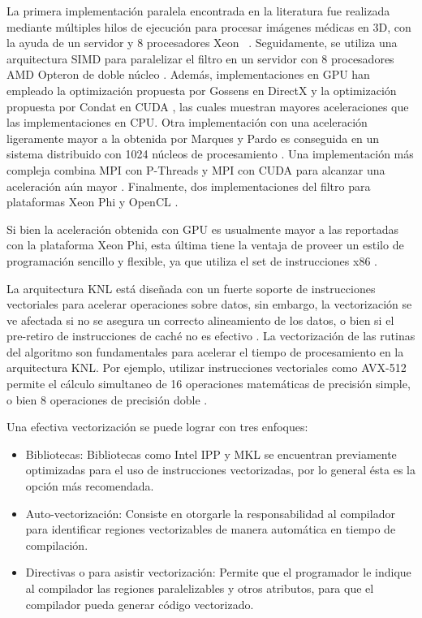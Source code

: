 La primera implementación paralela encontrada en la literatura fue realizada mediante múltiples hilos de ejecución para procesar imágenes médicas en 3D, con la ayuda de un servidor y 8 procesadores Xeon \ \cite{coupe2006fast}. Seguidamente, se utiliza una arquitectura SIMD para paralelizar el filtro en un servidor con 8 procesadores AMD Opteron de doble núcleo \cite{Darbon2008}. Además, implementaciones en GPU han empleado la optimización propuesta por Gossens en DirectX \cite{marques2013implementation} y la optimización propuesta por Condat en CUDA \cite{mingliang2016medical,goossens2010gpu}, las cuales muestran mayores aceleraciones que las implementaciones en CPU. Otra implementación con una aceleración ligeramente mayor a la obtenida por Marques y Pardo \cite{marques2013implementation} es conseguida en un sistema distribuido con 1024 núcleos de procesamiento \cite{shi2015optimized}. Una implementación más compleja combina MPI con P-Threads y MPI con CUDA para alcanzar una aceleración aún mayor \cite{nguyen2016medical}. Finalmente, dos implementaciones del filtro para plataformas Xeon Phi \cite{zhu2016parallel,huang2017parallel} y OpenCL \cite{zhu2016parallel}.

Si bien la aceleración obtenida con GPU es usualmente mayor a las reportadas con la plataforma Xeon Phi, esta última tiene la ventaja de proveer un estilo de programación sencillo y flexible, ya que utiliza el set de instrucciones x86 \cite{huang2017parallel}. 

La arquitectura KNL está dise\~nada con un fuerte soporte de instrucciones vectoriales para acelerar operaciones sobre datos, sin embargo,  la vectorización se ve afectada si no se asegura un correcto alineamiento de los datos, o bien si el pre-retiro de instrucciones de caché no es efectivo \cite{Jeffers201617:vect}.
La vectorización de las rutinas del algoritmo son fundamentales para acelerar el tiempo de procesamiento en la arquitectura KNL. Por ejemplo, utilizar instrucciones vectoriales como AVX-512 permite el cálculo simultaneo de 16 operaciones matemáticas de precisión simple, o bien 8 operaciones de precisión doble \cite{Jeffers201617:vect}.

Una efectiva vectorización se puede lograr con tres enfoques:

\begin{itemize}
\item Bibliotecas: Bibliotecas como Intel IPP y MKL se encuentran previamente optimizadas para el uso de instrucciones vectorizadas, por lo general \'esta es la opci\'on m\'as recomendada. 
\item Auto-vectorización: Consiste en otorgarle la responsabilidad al compilador para identificar regiones vectorizables de manera autom\'atica en tiempo de compilaci\'on.
\item Directivas o  para asistir vectorización: Permite que el programador le indique al compilador las regiones paralelizables y otros atributos, para que el compilador pueda generar c\'odigo vectorizado.
\end{itemize}
 

